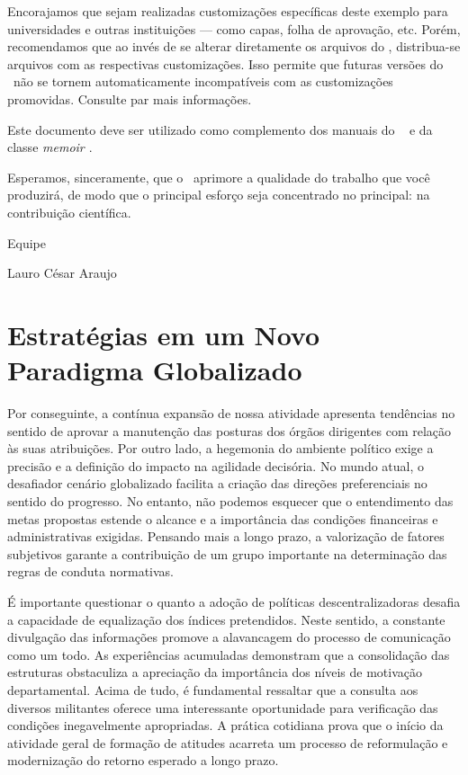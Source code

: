 Encorajamos que sejam realizadas customizações específicas deste exemplo para
universidades e outras instituições --- como capas, folha de aprovação, etc.
Porém, recomendamos que ao invés de se alterar diretamente os arquivos do
\abnTeX, distribua-se arquivos com as respectivas customizações.
Isso permite que futuras versões do \abnTeX~não se tornem automaticamente
incompatíveis com as customizações promovidas. Consulte
 par mais informações.

Este documento deve ser utilizado como complemento dos manuais do \abnTeX\ \cite{abntex2classe,abntex2cite,abntex2cite-alf} e da classe \emph{memoir \cite{memoir}}. 

Esperamos, sinceramente, que o \abnTeX\ aprimore a qualidade do trabalho que
você produzirá, de modo que o principal esforço seja concentrado no principal:
na contribuição científica.

Equipe \abnTeX 

Lauro César Araujo


\section{Estratégias em um Novo Paradigma Globalizado}
Por conseguinte, a contínua expansão de nossa atividade apresenta tendências no sentido de aprovar a manutenção das posturas dos órgãos dirigentes com relação às suas atribuições. Por outro lado, a hegemonia do ambiente político exige a precisão e a definição do impacto na agilidade decisória. No mundo atual, o desafiador cenário globalizado facilita a criação das direções preferenciais no sentido do progresso. No entanto, não podemos esquecer que o entendimento das metas propostas estende o alcance e a importância das condições financeiras e administrativas exigidas. Pensando mais a longo prazo, a valorização de fatores subjetivos garante a contribuição de um grupo importante na determinação das regras de conduta normativas. 

É importante questionar o quanto a adoção de políticas descentralizadoras desafia a capacidade de equalização dos índices pretendidos. Neste sentido, a constante divulgação das informações promove a alavancagem do processo de comunicação como um todo. As experiências acumuladas demonstram que a consolidação das estruturas obstaculiza a apreciação da importância dos níveis de motivação departamental. Acima de tudo, é fundamental ressaltar que a consulta aos diversos militantes oferece uma interessante oportunidade para verificação das condições inegavelmente apropriadas. A prática cotidiana prova que o início da atividade geral de formação de atitudes acarreta um processo de reformulação e modernização do retorno esperado a longo prazo. 

